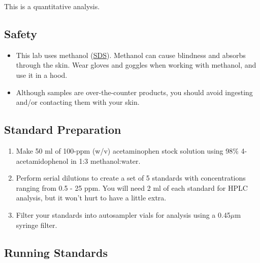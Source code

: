 \documentclass[]{tufte-book}
\providecommand{\tightlist}{%
  \setlength{\itemsep}{0pt}\setlength{\parskip}{0pt}}
\begin{document}
This is a quantitative analysis.

\hypertarget{safety-5}{%
\subsection*{Safety}\label{safety-5}}

\begin{itemize}
\tightlist
\item
  This lab uses methanol (\href{http://www.sciencelab.com/msds.php?msdsId=9927227}{SDS}). Methanol can cause blindness and absorbs through the skin. Wear gloves and goggles when working with methanol, and use it in a hood.\\
\item
  Although samples are over-the-counter products, you should avoid ingesting and/or contacting them with your skin.
\end{itemize}

\hypertarget{standard-preparation-2}{%
\subsection{Standard Preparation}\label{standard-preparation-2}}

\begin{enumerate}
\def\labelenumi{\arabic{enumi}.}
\tightlist
\item
  Make 50 ml of 100-ppm (w/v) acetaminophen stock solution using 98\% 4-acetamidophenol in 1:3 methanol:water.
\item
  Perform serial dilutions to create a set of 5 standards with concentrations ranging from 0.5 - 25 ppm. You will need 2 ml of each standard for HPLC analysis, but it won't hurt to have a little extra.
\item
  Filter your standards into autosampler vials for analysis using a 0.45\(\mu\)m syringe filter.
\end{enumerate}

\hypertarget{running-standards-1}{%
\subsection{Running Standards}\label{running-standards-1}}
\end{document}
